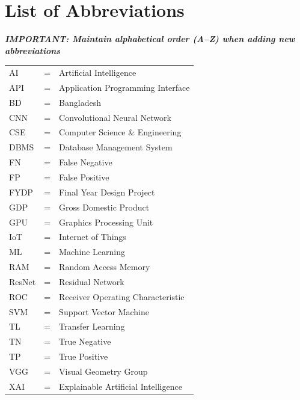 \chapter*{List of Abbreviations}


\noindent \textbf{\textit{IMPORTANT: Maintain alphabetical order (A--Z) when adding new abbreviations}}
\vspace{0.5cm}

\renewcommand{\arraystretch}{1.3} 
\noindent %
\begin{longtable}{@{} l @{\hspace{1.0cm}} c @{\hspace{1.0cm}} l @{}}
AI      & = & Artificial Intelligence \\
API     & = & Application Programming Interface \\
BD      & = & Bangladesh \\
CNN     & = & Convolutional Neural Network \\
CSE     & = & Computer Science \& Engineering \\
DBMS    & = & Database Management System \\
FN      & = & False Negative \\
FP      & = & False Positive \\
FYDP    & = & Final Year Design Project \\
GDP     & = & Gross Domestic Product \\
GPU     & = & Graphics Processing Unit \\
IoT     & = & Internet of Things \\
ML      & = & Machine Learning \\
RAM     & = & Random Access Memory \\
ResNet  & = & Residual Network \\
ROC     & = & Receiver Operating Characteristic \\
SVM     & = & Support Vector Machine \\
TL      & = & Transfer Learning \\
TN      & = & True Negative \\
TP      & = & True Positive \\
VGG     & = & Visual Geometry Group \\
XAI     & = & Explainable Artificial Intelligence \\
\end{longtable}
